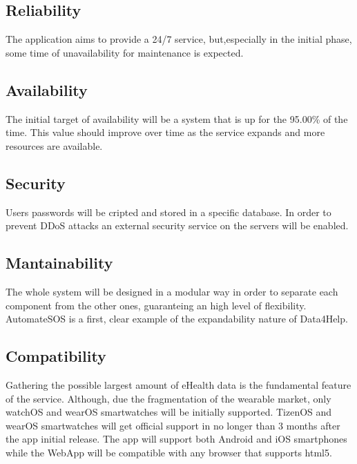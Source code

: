 \subsection{Reliability}
The application aims to provide a 24/7 service, but,especially in the initial phase, some time of unavailability for maintenance is expected.
\subsection{Availability}
The initial target of availability will be a system that is up for the 95.00\% of the time. This value should improve over time as the service expands and more resources are available.
\subsection{Security}
Users passwords will be cripted and stored in a specific database.
In order to prevent DDoS attacks an external security service on the servers will be enabled.
\subsection{Mantainability}
The whole system will be designed in a modular way in order to separate each component from the other ones, guaranteing an high level of flexibility. AutomateSOS is a first, clear example of the expandability nature of Data4Help.
\subsection{Compatibility}
Gathering the possible largest amount of eHealth data is the fundamental feature of the service. Although, due the fragmentation of the wearable market, only watchOS and wearOS smartwatches will be initially supported. TizenOS and wearOS smartwatches will get official support in no longer than 3 months after the app initial release.
The app will support both Android and iOS smartphones while the WebApp will be compatible with any browser that supports html5.